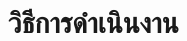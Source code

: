 \documentclass[12pt,oneside,openright,a4paper]{cpe-thai-project}
\begin{document}




 



\chapter{วิธีการดำเนินงาน}
\end{document}
